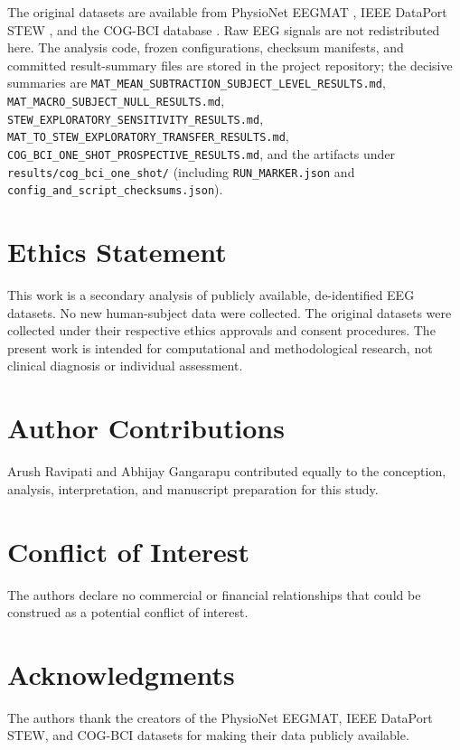 \documentclass[11pt]{article}
\begin{document}
The original datasets are available from PhysioNet EEGMAT
\cite{physionet_eegmat}, IEEE DataPort STEW \cite{stew_dataset}, and the COG-BCI
database \cite{hinss2023}. Raw EEG signals are not redistributed here. The
analysis code, frozen configurations, checksum manifests, and committed
result-summary files are stored in the project repository; the decisive
summaries are \texttt{MAT\_MEAN\_SUBTRACTION\_SUBJECT\_LEVEL\_RESULTS.md},
\texttt{MAT\_MACRO\_SUBJECT\_NULL\_RESULTS.md},
\texttt{STEW\_EXPLORATORY\_SENSITIVITY\_RESULTS.md},
\texttt{MAT\_TO\_STEW\_EXPLORATORY\_TRANSFER\_RESULTS.md},
\texttt{COG\_BCI\_ONE\_SHOT\_PROSPECTIVE\_RESULTS.md}, and the artifacts under
\texttt{results/cog\_bci\_one\_shot/} (including \texttt{RUN\_MARKER.json} and
\texttt{config\_and\_script\_checksums.json}).

\section{Ethics Statement}

This work is a secondary analysis of publicly available, de-identified EEG
datasets. No new human-subject data were collected. The original datasets were
collected under their respective ethics approvals and consent procedures. The
present work is intended for computational and methodological research, not
clinical diagnosis or individual assessment.

\section{Author Contributions}

Arush Ravipati and Abhijay Gangarapu contributed equally to the conception,
analysis, interpretation, and manuscript preparation for this study.

\section{Conflict of Interest}

The authors declare no commercial or financial relationships that could be
construed as a potential conflict of interest.

\section{Acknowledgments}

The authors thank the creators of the PhysioNet EEGMAT, IEEE DataPort STEW, and
COG-BCI datasets for making their data publicly available.


\end{document}

